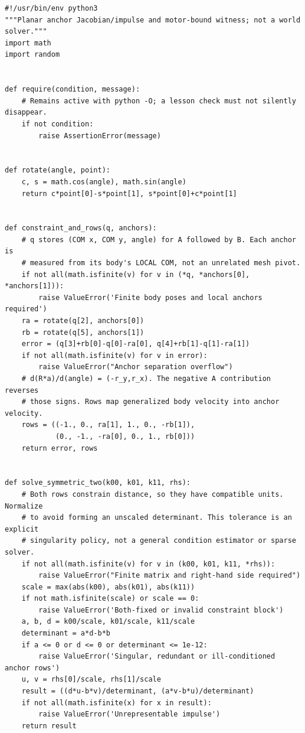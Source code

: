 \begin{verbatim}
#!/usr/bin/env python3
"""Planar anchor Jacobian/impulse and motor-bound witness; not a world solver."""
import math
import random


def require(condition, message):
    # Remains active with python -O; a lesson check must not silently disappear.
    if not condition:
        raise AssertionError(message)


def rotate(angle, point):
    c, s = math.cos(angle), math.sin(angle)
    return c*point[0]-s*point[1], s*point[0]+c*point[1]


def constraint_and_rows(q, anchors):
    # q stores (COM x, COM y, angle) for A followed by B. Each anchor is
    # measured from its body's LOCAL COM, not an unrelated mesh pivot.
    if not all(math.isfinite(v) for v in (*q, *anchors[0], *anchors[1])):
        raise ValueError('Finite body poses and local anchors required')
    ra = rotate(q[2], anchors[0])
    rb = rotate(q[5], anchors[1])
    error = (q[3]+rb[0]-q[0]-ra[0], q[4]+rb[1]-q[1]-ra[1])
    if not all(math.isfinite(v) for v in error):
        raise ValueError("Anchor separation overflow")
    # d(R*a)/d(angle) = (-r_y,r_x). The negative A contribution reverses
    # those signs. Rows map generalized body velocity into anchor velocity.
    rows = ((-1., 0., ra[1], 1., 0., -rb[1]),
            (0., -1., -ra[0], 0., 1., rb[0]))
    return error, rows


def solve_symmetric_two(k00, k01, k11, rhs):
    # Both rows constrain distance, so they have compatible units. Normalize
    # to avoid forming an unscaled determinant. This tolerance is an explicit
    # singularity policy, not a general condition estimator or sparse solver.
    if not all(math.isfinite(v) for v in (k00, k01, k11, *rhs)):
        raise ValueError("Finite matrix and right-hand side required")
    scale = max(abs(k00), abs(k01), abs(k11))
    if not math.isfinite(scale) or scale == 0:
        raise ValueError('Both-fixed or invalid constraint block')
    a, b, d = k00/scale, k01/scale, k11/scale
    determinant = a*d-b*b
    if a <= 0 or d <= 0 or determinant <= 1e-12:
        raise ValueError('Singular, redundant or ill-conditioned anchor rows')
    u, v = rhs[0]/scale, rhs[1]/scale
    result = ((d*u-b*v)/determinant, (a*v-b*u)/determinant)
    if not all(math.isfinite(x) for x in result):
        raise ValueError('Unrepresentable impulse')
    return result



\end{verbatim}
